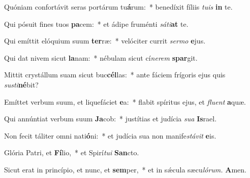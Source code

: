 \item Quóniam confortávit seras portárum tu\textbf{á}rum:~* benedíxit fíliis \textit{tuis} \textbf{in} te.
\item Qui pósuit fines tuos \textbf{pa}cem:~* et ádipe fruménti \textit{sáti}\textbf{at} te.
\item Qui emíttit elóquium suum \textbf{ter}ræ:~* velóciter currit \textit{sermo} \textbf{e}jus.
\item Qui dat nivem sicut \textbf{la}nam:~* nébulam sicut cí\tinyhspace\textit{nerem} \textbf{spar}git.
\item Mittit crystállum suam sicut buc\textbf{cél}las:~* ante fáciem frígoris ejus quis \textit{sus\-ti}\textbf{né}bit?
\item Emíttet verbum suum, et liquefáciet \textbf{e}a:~* flabit spíritus ejus, et \textit{fluent} \textbf{a}quæ.
\item Qui annúntiat verbum suum \textbf{Ja}cob:~* justítias et judícia \textit{sua} \textbf{Is}rael.
\item Non fecit táliter omni nati\textbf{ó}ni:~* et judícia sua non manife\tinyhspace\textit{stávit} \textbf{e}is.
\item Glória Patri, et \textbf{Fí}lio,~* et Spirí\tinyhspace\textit{tui} \textbf{San}cto.
\item Sicut erat in princípio, et nunc, et \textbf{sem}per,~* et in sǽcula sæcu\tinyhspace\textit{lórum.} \textbf{A}men.